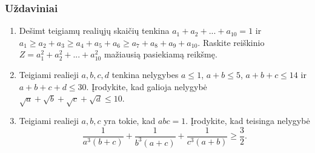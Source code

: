 \subsubsection{Uždaviniai}
\begin{enumerate}
  \item Dešimt teigiamų realiųjų skaičių tenkina $a_1+a_2+...+a_{10}=1$ ir
    $a_1\geq a_2+a_3\geq a_4+a_5+a_6\geq a_7+a_8+a_9+a_{10}$. Raskite
    reiškinio $Z=a_1^2+a_2^2+...+a_{10}^2$ mažiausią pasiekiamą reikšmę.
  \item Teigiami realieji $a,b,c,d$ tenkina nelygybes $a\leq1$, $a+b\leq5$,
    $a+b+c\leq14$ ir $a+b+c+d\leq30$. Įrodykite, kad galioja nelygybė
    $\sqrt{a}+\sqrt{b}+\sqrt{c}+\sqrt{d}\leq10$.
  \item \text{[IMO 1995]} Teigiami realieji $a,b,c$ yra tokie, kad $abc=1$.
    Įrodykite, kad teisinga nelygybė
    $$\frac{1}{a^3(b+c)}+\frac{1}{b^3(a+c)}+\frac{1}{c^3(a+b)}\geq\frac{3}{2}.$$

\end{enumerate}
